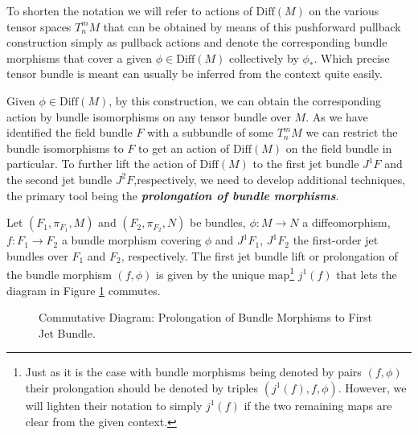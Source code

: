 To shorten the notation we will refer to actions of $\mathrm{Diff}(M)$ on the various tensor spaces $T^m_nM$ that can be obtained by means of this pushforward pullback construction simply as pullback actions and denote the corresponding bundle morphisms that cover a given $\phi \in \mathrm{Diff}(M)$ collectively by $\phi_{\ast}$. Which precise tensor bundle is meant can usually be inferred from the context quite easily.

Given $\phi \in \mathrm{Diff}(M)$, by this construction, we can obtain the corresponding action by bundle isomorphisms on any tensor bundle over $M$. As we have identified the field bundle $F$ with a subbundle of some $T^m_nM$ we can restrict the bundle isomorphisms to $F$ to get an action of $\mathrm{Diff}(M)$ on the field bundle in particular. 
To further lift the action of $\mathrm{Diff}(M)$ to the first jet bundle $J^1F$ and the second jet bundle $J^2F$,respectively, we need to develop additional techniques, the primary tool being the \textbf{\textit{prolongation of bundle morphisms}}. 
\begin{definition}
Let $(F_1,\pi_{F_1},M)$ and $(F_2,\pi_{F_2},N)$ be bundles, $\phi : M \rightarrow N$ a diffeomorphism, $f : F_1 \rightarrow F_2$ a bundle morphism covering $\phi$ and $J^1F_1$, $J^1F_2$ the first-order jet bundles over $F_1$ and $F_2$, respectively. The first jet bundle lift or prolongation of the bundle morphism $(f,\phi)$ is given by the unique map\footnote{Just as it is the case with bundle morphisms being denoted by pairs $(f,\phi)$ their prolongation should be denoted by triples $(j^1(f),f,\phi)$. However, we will lighten their notation to simply $j^1(f)$ if the two remaining maps are clear from the given context.} $j^1(f)$ that lets the diagram in Figure \ref{ProlongMorph} commutes.
\begin{figure}[hbt!]
\centering
{}
\caption{Commutative Diagram: Prolongation of Bundle Morphisms to First Jet Bundle.}\label{ProlongMorph}
\end{figure}
\end{definition}
